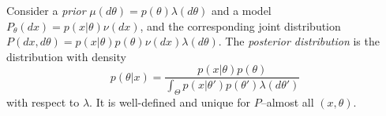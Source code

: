\documentclass[
	fontsize=11pt, %
	twoside=false, %
	numbers=noenddot, %
]{kaobook}
\begin{document}

\begin{definition}
	Consider a \emph{prior} $\mu(d \theta) = p(\theta) \lambda(d \theta)$ and a model $P_\theta(dx) = p(x | \theta) \nu(dx)$, and the corresponding joint distribution $P(dx, d\theta) = p(x | \theta) p(\theta) \nu(dx) \lambda(d \theta)$.
	The \emph{posterior distribution} is the distribution with density
	\begin{equation*}
		p(\theta | x) = \frac{p(x | \theta) p(\theta)}{\int_\Theta p(x | \theta') p(\theta') \lambda(d \theta')}
	\end{equation*}
	with respect to $\lambda$. 
	It is well-defined and unique for $P$--almost all $(x, \theta)$.
\end{definition}
\end{document}
